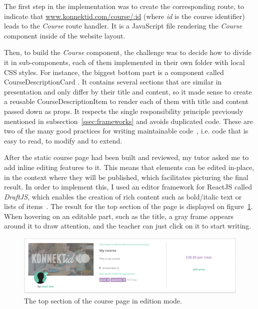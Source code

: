The first step in the implementation was to create the corresponding route, to indicate that \url{www.konnektid.com/course/:id} (where \textit{id} is the course identifier) leads to the \textit{Course} route handler. It is a JavaScript file rendering the \textit{Course} component inside of the website layout.

Then, to build the \textit{Course} component, the challenge was to decide how to divide
it in sub-components, each of them implemented in their own folder with local CSS styles. For instance, the biggest bottom part is a component called
\guillemotleft{} CourseDescriptionCard \guillemotright{}. It contains several sections that are similar in presentation and only differ by their title and content, so
it made sense to create a reusable \guillemotleft{} CourseDescriptionItem \guillemotright{} to render each of them with title and content passed down as props. It respects the single responsibility principle previously mentioned in {\sc subsection}~\ref{ssec:frameworks} and avoids duplicated code.
These are two of the many good practices for writing maintainable code~\cite{maintainable}, i.e. code that is easy to read, to modify and to extend.

After the static course page had been built and reviewed, my tutor asked me to add inline editing features to it.
This means that elements can be edited in-place, in the context where they will be published, which facilitates picturing the final result.
In order to implement this, I used an editor framework for ReactJS called \textit{DraftJS}, which enables the creation of rich content such as bold/italic text or lists of items~\cite{draftJS}. The result for the top section of the page is displayed on {\sc figure}~\ref{fig:courseEditIntro}. When hovering on an editable part, such as the title, a gray frame appears around it to draw attention, and the teacher can just click on it to start writing.

\begin{figure}[H]
    \centering
    \includegraphics[scale=0.2]{figure/courseEditIntro.png}
    \caption{The top section of the course page in edition mode.}
    \label{fig:courseEditIntro}
\end{figure}

